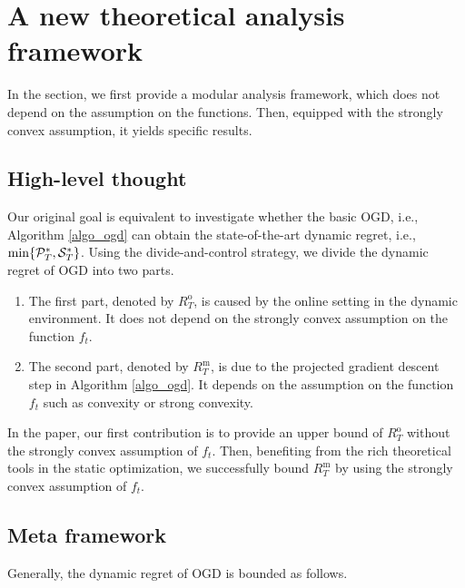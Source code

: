 \documentclass[journal]{IEEEtran}
\begin{document}
\section{A new theoretical analysis framework}
\label{sect_theoretical_analysis}

In the section, we first provide a modular analysis framework, which does not depend on the assumption on the functions. Then, equipped with the strongly convex assumption, it yields specific results. 

\subsection{High-level thought}

Our original goal is equivalent to investigate whether the basic OGD, i.e., Algorithm \ref{algo_ogd} can obtain the state-of-the-art dynamic regret, i.e., $\min\{{\mathcal{P}}_T^{\ast}, {\mathcal{S}}_T^{\ast}\}$.  Using the divide-and-control strategy, we divide the dynamic regret of OGD into two parts. 
\begin{enumerate}
\item The first part, denoted by $R^{\mathrm{o}}_T$, is caused by the online setting in the dynamic environment. It does not depend on the strongly convex assumption on the function $f_t$. 
\item The second part, denoted by $R^{\mathrm{m}}_T$, is due to the projected gradient descent step in Algorithm \ref{algo_ogd}. It depends on the assumption on the function $f_t$ such as convexity or strong convexity. 
\end{enumerate}

In the paper, our first contribution is to provide an upper bound of $R^{\mathrm{o}}_T$ without the strongly convex assumption of $f_t$. Then, benefiting from the rich theoretical tools in the static optimization, we successfully bound $R^{\mathrm{m}}_T $ by using the strongly convex assumption of $f_t$. 


\subsection{Meta framework}
Generally, the dynamic regret of OGD is bounded as follows. 
\end{document}
